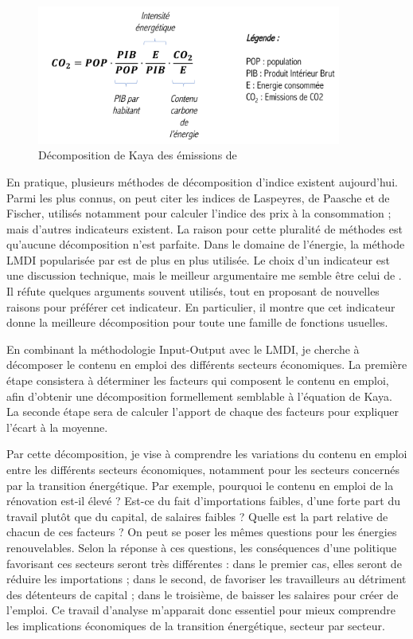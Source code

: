 \begin{figure}[!ht]
	\centering
	\includegraphics[width=10cm]{figures/Kaya.pdf}
	\caption[Décomposition de Kaya des émissions]{Décomposition de Kaya des émissions de \coo}
	\label{fig:kaya}
\end{figure}

En pratique, plusieurs méthodes de décomposition d'indice existent aujourd'hui. Parmi les plus connus, on peut citer les indices de Laspeyres, de Paasche et de Fischer, utilisés notamment pour calculer l'indice des prix à la consommation ; mais d'autres indicateurs existent. La raison pour cette pluralité de méthodes est qu'aucune décomposition n'est parfaite. Dans le domaine de l'énergie, la méthode LMDI popularisée par \citet{Ang2004} est de plus en plus utilisée. Le choix d'un indicateur est une discussion technique, mais le meilleur argumentaire me semble être celui de \citet{Muller}. Il réfute quelques arguments souvent utilisés, tout en proposant de nouvelles raisons pour préférer cet indicateur. En particulier, il montre que cet indicateur donne la meilleure décomposition pour toute une famille de fonctions usuelles.

En combinant la méthodologie Input-Output avec le LMDI, je cherche à décomposer le contenu en emploi des différents secteurs économiques. La première étape consistera à déterminer les facteurs qui composent le contenu en emploi, afin d'obtenir une décomposition formellement semblable à l'équation de Kaya.
La seconde étape sera de calculer l'apport de chaque des facteurs pour expliquer l'écart à la moyenne.

Par cette décomposition, je vise à comprendre les variations du contenu en emploi entre les différents secteurs économiques, notamment pour les secteurs concernés par la transition énergétique.
Par exemple, pourquoi le contenu en emploi de la rénovation est-il élevé ? Est-ce du fait d'importations faibles, d'une forte part du travail plutôt que du capital, de salaires faibles ? Quelle est la part relative de chacun de ces facteurs ? On peut se poser les mêmes questions pour les énergies renouvelables.
Selon la réponse à ces questions, les conséquences d'une politique favorisant ces secteurs seront très différentes : dans le premier cas, elles seront de réduire les importations ; dans le second, de favoriser les travailleurs au détriment des détenteurs de capital ; dans le troisième, de baisser les salaires pour créer de l'emploi. 
Ce travail d'analyse m'apparait donc essentiel pour mieux comprendre les implications économiques de la transition énergétique, secteur par secteur.



